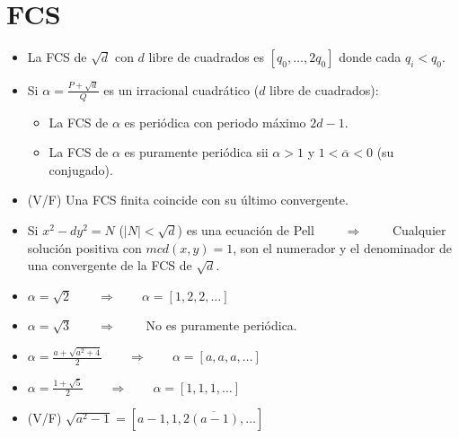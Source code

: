 \documentclass[fleqn]{article}
\def\next{\qquad \Rightarrow \qquad}
\begin{document}
    \section{FCS}
    \begin{itemize}
        \item La FCS de $\sqrt{d}$ con $d$ libre de cuadrados es $[q_0, \dots, 2q_0]$ donde cada $q_i < q_0$.
        \item Si $\alpha = \frac{P + \sqrt{d}}{Q}$ es un irracional cuadrático ($d$ libre de cuadrados): 
                \begin{itemize}
                    \item La FCS de $\alpha$ es periódica con periodo máximo $2d - 1$.
                    \item La FCS de $\alpha$ es puramente periódica sii $\alpha > 1$ y $1 < \overline{\alpha} < 0$ (su conjugado).
                \end{itemize}
        \item (V/F) Una FCS finita coincide con su último convergente.
        \item Si $x^2 - dy^2 = N$ ($|N| < \sqrt{d}$) es una ecuación de Pell $\next$ Cualquier solución positiva con $mcd(x,y) = 1$, son el numerador y el denominador de una convergente de la FCS de $\sqrt{d}$.
        \item $\alpha = \sqrt{2} \next \alpha = [1,2,2,\dots]$
        \item $\alpha = \sqrt{3} \next $ No es puramente periódica.
        \item $\alpha = \frac{a + \sqrt{a^2 + 4}}{2} \next \alpha = [a,a,a,\dots]$
        \item $\alpha = \frac{1 + \sqrt{5}}{2} \next \alpha = [1,1,1,\dots]$
        \item (V/F) $\sqrt{a^2 - 1} = [a-1, \overline{1, 2(a-1), \dots}]$
    \end{itemize}
\end{document}
